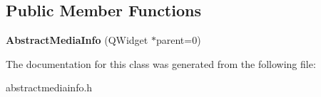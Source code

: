 \subsection*{Public Member Functions}
\begin{DoxyCompactItemize}
\item 
\hypertarget{class_abstract_media_info_a9e2f1e341c8be06217de939859c93045}{{\bfseries Abstract\-Media\-Info} (Q\-Widget $\ast$parent=0)}\label{class_abstract_media_info_a9e2f1e341c8be06217de939859c93045}

\end{DoxyCompactItemize}


The documentation for this class was generated from the following file\-:\begin{DoxyCompactItemize}
\item 
abstractmediainfo.\-h\end{DoxyCompactItemize}
